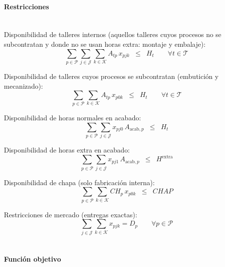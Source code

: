 \paragraph{Restricciones}\mbox{}\\

\noindent
Disponibilidad de talleres internos (aquellos talleres cuyos procesos no se subcontratan y donde no se usan horas extra: montaje y embalaje):
\begin{equation}
\sum_{p \in \mathcal{P}} \sum_{j \in \mathcal{J}} \sum_{k \in \mathcal{K}} A_{tp}\, x_{p j k} \;\; \leq \;\; H_t \qquad \forall t \in \mathcal{T}
\end{equation}

Disponibilidad de talleres cuyos procesos se subcontratan (embutición y mecanizado):
\begin{equation}
\sum_{p \in \mathcal{P}} \sum_{k \in \mathcal{K}} A_{tp}\, x_{p 0 k} \;\; \leq \;\; H_t \qquad \forall t \in \mathcal{T}
\end{equation}

\noindent
Disponibilidad de horas normales en acabado:
\begin{equation}
\sum_{p \in \mathcal{P}} \sum_{j \in \mathcal{J}} x_{p j 0  }\, A_{\text{acab},p} \;\; \leq \;\; H_t
\end{equation}

\noindent
Disponibilidad de horas extra en acabado:
\begin{equation}
\sum_{p \in \mathcal{P}} \sum_{j \in \mathcal{J}} x_{p j 1}\, A_{\text{acab},p} \;\; \leq \;\; H^{\text{extra}}
\end{equation}

\noindent
Disponibilidad de chapa (solo fabricación interna):
\begin{equation}
\sum_{p \in \mathcal{P}} \sum_{k \in \mathcal{K}} CH_p \, x_{p0k} \;\; \leq \;\; CHAP
\end{equation}

\noindent
Restricciones de mercado (entregas exactas):
\begin{equation}
\sum_{j \in \mathcal{J}} \sum_{k \in \mathcal{K}} x_{p j k} = D_p \qquad \forall p \in \mathcal{P}
\end{equation}
\\



\paragraph{Función objetivo}\mbox{}\\


